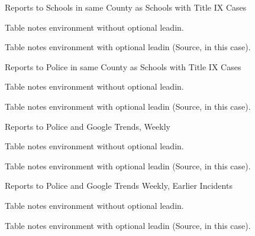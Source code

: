 \documentclass[AER]{AEA}
\begin{document}
\begin{table}
\caption{Reports to Schools in same County as Schools with Title IX Cases}



\begin{tablenotes}
Table notes environment without optional leadin.
\end{tablenotes}
\begin{tablenotes}[Source]
Table notes environment with optional leadin (Source, in this case).
\end{tablenotes}
\end{table}

\begin{table}
\caption{Reports to Police in same County as Schools with Title IX Cases}



\begin{tablenotes}
Table notes environment without optional leadin.
\end{tablenotes}
\begin{tablenotes}[Source]
Table notes environment with optional leadin (Source, in this case).
\end{tablenotes}
\end{table}

\begin{table}
\caption{Reports to Police and Google Trends, Weekly}



\begin{tablenotes}
Table notes environment without optional leadin.
\end{tablenotes}
\begin{tablenotes}[Source]
Table notes environment with optional leadin (Source, in this case).
\end{tablenotes}
\end{table}

\begin{table}
\caption{Reports to Police and Google Trends Weekly, Earlier Incidents}



\begin{tablenotes}
Table notes environment without optional leadin.
\end{tablenotes}
\begin{tablenotes}[Source]
Table notes environment with optional leadin (Source, in this case).
\end{tablenotes}
\end{table}
\end{document}
